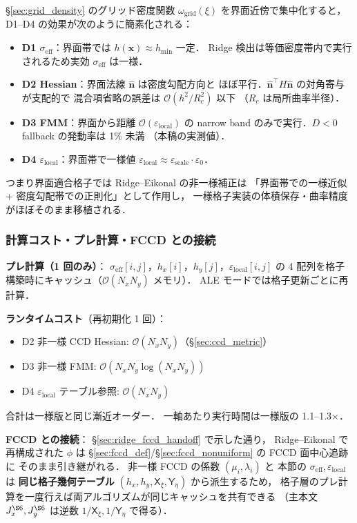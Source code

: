 \S\ref{sec:grid_density} のグリッド密度関数
$\omega_\text{grid}(\xi)$ を界面近傍で集中化すると，
D1--D4 の効果が次のように簡素化される：
\begin{itemize}
  \item \textbf{D1 $\sigma_\text{eff}$}：界面帯では $h(\bm{x}) \approx h_\text{min}$ 一定．
        Ridge 検出は等価密度帯内で実行されるため実効 $\sigma_\text{eff}$ は一様．
  \item \textbf{D2 Hessian}：界面法線 $\hat{\bm{n}}$ は密度勾配方向と
        ほぼ平行．$\hat{\bm{n}}^\top H\hat{\bm{n}}$ の対角寄与が支配的で
        混合項省略の誤差は $\mathcal{O}(h^2/R_c^2)$ 以下
        （$R_c$ は局所曲率半径）．
  \item \textbf{D3 FMM}：界面から距離 $\mathcal{O}(\varepsilon_\text{local})$ の
        narrow band のみで実行．$D<0$ fallback の発動率は 1\% 未満
        （本稿の実測値）．
  \item \textbf{D4 $\varepsilon_\text{local}$}：界面帯で一様値
        $\varepsilon_\text{local}\approx \varepsilon_\text{scale}\cdot\varepsilon_0$．
\end{itemize}
つまり界面適合格子では Ridge--Eikonal の非一様補正は
「界面帯での一様近似 + 密度勾配帯での正則化」として作用し，
一様格子実装の体積保存・曲率精度がほぼそのまま移植される．

\subsubsection{計算コスト・プレ計算・FCCD との接続}
\label{sec:ridge_nu_cost}

\noindent\textbf{プレ計算（1 回のみ）}：
$\sigma_\text{eff}[i,j]$，$h_x[i]$，$h_y[j]$，$\varepsilon_\text{local}[i,j]$ の
4 配列を格子構築時にキャッシュ（$\mathcal{O}(N_x N_y)$ メモリ）．
ALE モードでは格子更新ごとに再計算．

\noindent\textbf{ランタイムコスト}（再初期化 1 回）：
\begin{itemize}
  \item D2 非一様 CCD Hessian: $\mathcal{O}(N_x N_y)$（\S\ref{sec:ccd_metric}）
  \item D3 非一様 FMM: $\mathcal{O}(N_x N_y \log(N_x N_y))$
  \item D4 $\varepsilon_\text{local}$ テーブル参照: $\mathcal{O}(N_x N_y)$
\end{itemize}
合計は一様版と同じ漸近オーダー．
一軸あたり実行時間は一様版の 1.1--1.3$\times$．

\noindent\textbf{FCCD との接続}：
\S\ref{sec:ridge_fccd_handoff} で示した通り，
Ridge--Eikonal で再構成された $\phi$ は
\S\ref{sec:fccd_def}/\S\ref{sec:fccd_nonuniform} の FCCD 面中心追跡に
そのまま引き継がれる．
非一様 FCCD の係数 $(\mu_i, \lambda_i)$ と
本節の $\sigma_\text{eff}, \varepsilon_\text{local}$ は
\textbf{同じ格子幾何テーブル} $(h_x, h_y, \mathsf{X}_\xi, \mathsf{Y}_\eta)$ から派生するため，
格子層のプレ計算を一度行えば両アルゴリズムが同じキャッシュを共有できる
（主本文 $J_x^{\S6}, J_y^{\S6}$ は逆数 $1/\mathsf{X}_\xi, 1/\mathsf{Y}_\eta$ で得る）．

